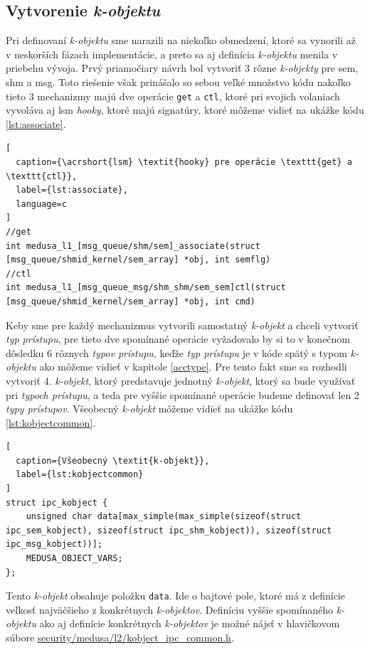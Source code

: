 \subsection{Vytvorenie \textit{k-objektu}} \label{kobjectimpl}
Pri definovaní \textit{k-objektu} sme narazili na niekoľko obmedzení, ktoré sa vynorili až v neskorších fázach implementácie, a preto sa aj definícia \textit{k-objektu} menila v priebehu vývoja. Prvý priamočiary návrh bol vytvoriť 3 rôzne \textit{k-objekty} pre \acrshort{sem}, \acrshort{shm} a \acrshort{msg}. Toto riešenie však prinášalo so sebou veľké množstvo kódu nakoľko tieto 3 mechanizmy majú dve operácie \texttt{get} a \texttt{ctl}, ktoré pri svojich volaniach vyvoláva aj \acrshort{lsm} \textit{hooky}, ktoré majú signatúry, ktoré môžeme vidieť na ukážke kódu \ref{lst:associate}.
\begin{lstlisting}[
  caption={\acrshort{lsm} \textit{hooky} pre operácie \texttt{get} a \texttt{ctl}},
  label={lst:associate},
  language=c
]
//get
int medusa_l1_[msg_queue/shm/sem]_associate(struct [msg_queue/shmid_kernel/sem_array] *obj, int semflg)
//ctl
int medusa_l1_[msg_queue_msg/shm_shm/sem_sem]ctl(struct [msg_queue/shmid_kernel/sem_array] *obj, int cmd)
\end{lstlisting} 
Keby sme pre každý mechanizmus vytvorili samostatný \textit{k-objekt} a chceli vytvoriť \textit{typ prístupu}, pre tieto dve spomínané operácie vyžadovalo by si to v konečnom dôsledku 6 rôznych \textit{typov prístupu}, keďže \textit{typ prístupu} je v kóde spätý s typom \textit{k-objektu} ako môžeme vidieť v kapitole \ref{acctype}. 
Pre tento fakt sme sa rozhodli vytvoriť 4. \textit{k-objekt}, ktorý predstavuje jednotný \textit{k-objekt}, ktorý sa bude využívať pri \textit{typoch prístupu}, a teda pre vyššie spomínané operácie budeme definovať len 2 \textit{typy prístupov}. Všeobecný \textit{k-objekt} môžeme vidieť na ukážke kódu \ref{lst:kobjectcommon}. 
\begin{lstlisting}[
  caption={Všeobecný \textit{k-objekt}},
  label={lst:kobjectcommon}
]
struct ipc_kobject {	
	unsigned char data[max_simple(max_simple(sizeof(struct ipc_sem_kobject), sizeof(struct ipc_shm_kobject)), sizeof(struct ipc_msg_kobject))];	
	MEDUSA_OBJECT_VARS;
};
\end{lstlisting} 
Tento \textit{k-objekt} obsahuje položku \texttt{data}. Ide o bajtové pole, ktoré má z definície veľkosť najväčšieho z konkrétnych \textit{k-objektov}. Definíciu vyššie spomínaného \textit{k-objektu} ako aj definície konkrétnych \textit{k-objektov} je možné nájsť v hlavičkovom súbore \url{security/medusa/l2/kobject_ipc_common.h}. 

